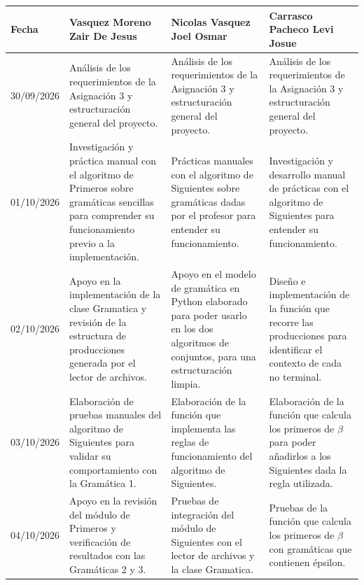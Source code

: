 \newpage
\small
\begin{longtable}{|P{2cm}|P{4.4cm}|P{4.4cm}|P{4.4cm}|}
\hline
{}
{\color{white}\textbf{Fecha}} &
{\color{white}\textbf{Vasquez Moreno Zair De Jesus}} &
{\color{white}\textbf{Nicolas Vasquez Joel Osmar}} &
{\color{white}\textbf{Carrasco Pacheco Levi Josue}} \\
\hline
\endhead

30/09/2026 &
  Análisis de los requerimientos de la Asignación 3 y estructuración general del proyecto. &
  Análisis de los requerimientos de la Asignación 3 y estructuración general del proyecto. &
  Análisis de los requerimientos de la Asignación 3 y estructuración general del proyecto. \\[4pt]
\hline

01/10/2026 &
  Investigación y práctica manual con el algoritmo de Primeros sobre gramáticas sencillas
  para comprender su funcionamiento previo a la implementación. &
  Prácticas manuales con el algoritmo de Siguientes sobre gramáticas dadas por el profesor
  para entender su funcionamiento. &
  Investigación y desarrollo manual de prácticas con el algoritmo de Siguientes para
  entender su funcionamiento. \\[4pt]
\hline

02/10/2026 &
  Apoyo en la implementación de la clase Gramatica y revisión de la estructura de
  producciones generada por el lector de archivos. &
  Apoyo en el modelo de gramática en Python elaborado para poder usarlo en los dos
  algoritmos de conjuntos, para una estructuración limpia. &
  Diseño e implementación de la función que recorre las producciones para identificar el
  contexto de cada no terminal. \\[4pt]
\hline

03/10/2026 &
  Elaboración de pruebas manuales del algoritmo de Siguientes para validar su
  comportamiento con la Gramática 1. &
  Elaboración de la función que implementa las reglas de funcionamiento del algoritmo de
  Siguientes. &
  Elaboración de la función que calcula los primeros de $\beta$ para poder añadirlos a los
  Siguientes dada la regla utilizada. \\[4pt]
\hline

04/10/2026 &
  Apoyo en la revisión del módulo de Primeros y verificación de resultados con las
  Gramáticas 2 y 3. &
  Pruebas de integración del módulo de Siguientes con el lector de archivos y la clase
  Gramatica. &
  Pruebas de la función que calcula los primeros de $\beta$ con gramáticas que contienen
  épsilon. \\[4pt]
\hline


\end{longtable}
